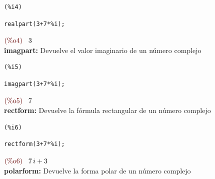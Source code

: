 \documentclass[10pt,a4paper]{book}
\begin{document}
\noindent
\begin{minipage}[t]{8ex}{\color{red}\bf
\begin{verbatim}
(%i4) 
\end{verbatim}}
\end{minipage}
\begin{minipage}[t]{\textwidth}{\color{blue}
\begin{verbatim}
realpart(3+7*%i);
\end{verbatim}}
\end{minipage}
\begin{math}\displaystyle
\parbox{8ex}{\color{labelcolor}(\%o4) }
3
\end{math}
\\ \textbf{imagpart: } Devuelve el valor imaginario de un número complejo\\

\noindent
\begin{minipage}[t]{8ex}{\color{red}\bf
\begin{verbatim}
(%i5) 
\end{verbatim}}
\end{minipage}
\begin{minipage}[t]{\textwidth}{\color{blue}
\begin{verbatim}
imagpart(3+7*%i);
\end{verbatim}}
\end{minipage}
\begin{math}\displaystyle
\parbox{8ex}{\color{labelcolor}(\%o5) }
7
\end{math}
\\ \textbf{rectform: } Devuelve la fórmula rectangular de un número complejo\\

\noindent
\begin{minipage}[t]{8ex}{\color{red}\bf
\begin{verbatim}
(%i6) 
\end{verbatim}}
\end{minipage}
\begin{minipage}[t]{\textwidth}{\color{blue}
\begin{verbatim}
rectform(3+7*%i);
\end{verbatim}}
\end{minipage}
\begin{math}\displaystyle
\parbox{8ex}{\color{labelcolor}(\%o6) }
7\,i+3
\end{math}
\\ \textbf{polarform: } Devuelve la forma polar de un número complejo\\
\end{document}
